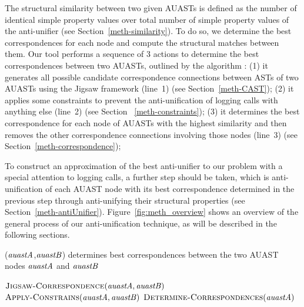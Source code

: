 The structural similarity between two given AUASTs is defined as the number of identical simple property values over total number of simple property values of the anti-unifier (see Section~\ref{meth-similarity}). To do so, we determine the best correspondences for each node and compute the structural matches between them. Our tool performs a sequence of 3 actions to determine the best correspondences between two AUASTs, outlined by the algorithm : (1) it generates all possible candidate correspondence connections between ASTs of two AUASTs using the Jigsaw framework (line~1) (see Section~\ref{meth-CAST}); (2) it applies some constraints to prevent the anti-unification of logging calls with anything else (line~2) (see Section ~\ref{meth-constraints}); (3) it determines the best correspondence for each node of AUASTs with the highest similarity and then removes the other correspondence connections involving those nodes (line~3) (see Section~\ref{meth-correspondence});

To construct an approximation of the best anti-unifier to our problem with a special attention to logging calls, a further step should be taken, which is anti-unification of each AUAST node with its best correspondence determined in the previous step through anti-unifying their structural properties (see Section~\ref{meth-antiUnifier}). Figure~\ref{fig:meth_overview} shows an overview of the general process of our anti-unification technique, as will be described in the following sections.


\begin{algorithm}
\caption{($\mathit{auastA}$,$\mathit{auastB}$) determines best correspondences between the two AUAST nodes $\mathit{auastA}$ and $\mathit{auastB}$}
\label{overview}
\begin{algorithmic}[1]
\DetermineBest
   \State  $\textsc{Jigsaw-Correspondence}(\mathit{auastA},\mathit{auastB})$
   \State $\textsc{Apply-Constrains}(\mathit{auastA},\mathit{auastB})$
   \State $ \textsc{Determine-Correspondences}(\mathit{auastA})$
\end{algorithmic}
\end{algorithm}






